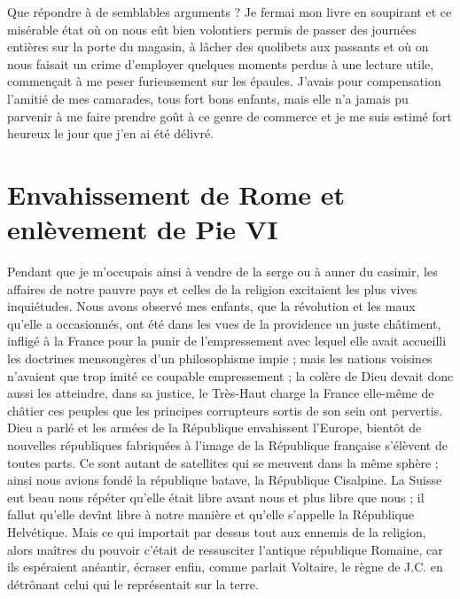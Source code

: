 \documentclass[11pt,a4paper]{report}
\begin{document}
Que répondre à de semblables arguments ? Je fermai mon livre en soupirant et ce misérable état où on nous eût bien volontiers permis de passer des journées entières sur la porte du magasin, à lâcher des quolibets aux passants et où on nous faisait un crime d'employer quelques moments perdus à une lecture utile, commençait à me peser furieusement sur les épaules. J'avais pour compensation l'amitié de mes camarades, tous fort bons enfants, mais elle n'a jamais pu parvenir à me faire prendre goût à ce genre de commerce et je me suis estimé fort heureux le jour que j'en ai été délivré.

\section*{Envahissement de Rome et enlèvement de Pie VI}

Pendant que je m'occupais ainsi à vendre de la serge ou à auner du casimir, les affaires de notre pauvre pays et celles de la religion excitaient les plus vives inquiétudes. Nous avons observé mes enfants, que la révolution et les maux qu'elle a occasionnés, ont été dans les vues de la providence un juste châtiment, infligé à la France pour la punir de l'empressement avec lequel elle avait accueilli les doctrines mensongères d'un philosophisme impie ; mais les nations voisines n'avaient que trop imité ce coupable empressement ; la colère de Dieu devait donc aussi les atteindre, dans sa justice, le Très-Haut charge la France elle-même de châtier ces peuples que les principes corrupteurs sortis de son sein ont pervertis. Dieu a parlé et les armées de la République envahissent l'Europe, bientôt de nouvelles républiques fabriquées à l'image de la République française s'élèvent de toutes parts. Ce sont autant de satellites qui se meuvent dans la même sphère ; ainsi nous avions fondé la république batave, la République Cisalpine. La Suisse eut beau nous répéter qu'elle était libre avant nous et plus libre que nous ; il fallut qu'elle devînt libre à notre manière et qu'elle s'appelle la République Helvétique. Mais ce qui importait par dessus tout aux ennemis de la religion, alors maîtres du pouvoir c'était de ressusciter l'antique république Romaine, car ils espéraient anéantir, écraser enfin, comme parlait Voltaire, le règne de J.C. en détrônant celui qui le représentait sur la terre.
\end{document}
